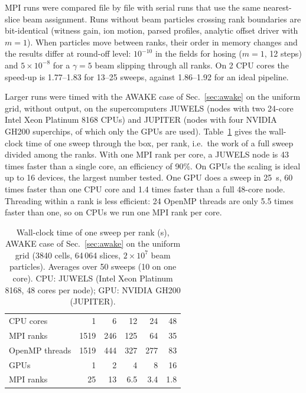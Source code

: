 \documentclass[aps,prab,reprint,floatfix,superscriptaddress,amsmath,amssymb]{revtex4-2}
\begin{document}
MPI runs were compared file by file with serial runs that use the same nearest-slice beam assignment. Runs without beam particles crossing rank boundaries are bit-identical (witness gain, ion motion, parsed profiles, analytic offset driver with $m=1$). When particles move between ranks, their order in memory changes and the results differ at round-off level: $10^{-10}$ in the fields for hosing ($m=1$, 12 steps) and $5\times10^{-8}$ for a $\gamma=5$ beam slipping through all ranks. On 2 CPU cores the speed-up is 1.77--1.83 for 13--25 sweeps, against 1.86--1.92 for an ideal pipeline.

Larger runs were timed with the AWAKE case of Sec.~\ref{sec:awake} on the uniform grid, without output, on the supercomputers JUWELS (nodes with two 24-core Intel Xeon Platinum 8168 CPUs) and JUPITER (nodes with four NVIDIA GH200 superchips, of which only the GPUs are used). Table~\ref{tab:perf} gives the wall-clock time of one sweep through the box, per rank, i.e.\ the work of a full sweep divided among the ranks. With one MPI rank per core, a JUWELS node is 43 times faster than a single core, an efficiency of 90\%. On GPUs the scaling is ideal up to 16 devices, the largest number tested. One GPU does a sweep in 25~s, 60 times faster than one CPU core and 1.4 times faster than a full 48-core node. Threading within a rank is less efficient: 24 OpenMP threads are only 5.5 times faster than one, so on CPUs we run one MPI rank per core.

\begin{table}[t]
\caption{Wall-clock time of one sweep per rank (s), AWAKE case of Sec.~\ref{sec:awake} on the uniform grid (3840 cells, 64\,064 slices, $2\times10^7$ beam particles). Averages over 50 sweeps (10 on one core). CPU: JUWELS (Intel Xeon Platinum 8168, 48 cores per node); GPU: NVIDIA GH200 (JUPITER).}
\label{tab:perf}
\begin{ruledtabular}
\begin{tabular}{lrrrrr}
CPU cores & 1 & 6 & 12 & 24 & 48 \\
MPI ranks & 1519 & 246 & 125 & 64 & 35 \\
OpenMP threads & 1519 & 444 & 327 & 277 & 83\footnotemark[1] \\ \hline
GPUs & 1 & 2 & 4 & 8 & 16 \\
MPI ranks & 25 & 13 & 6.5 & 3.4 & 1.8 \\
\end{tabular}
\end{ruledtabular}
\end{table}
\end{document}
